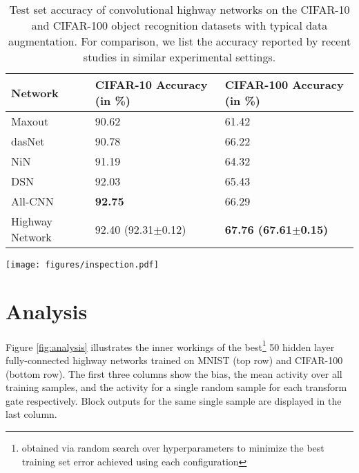 \documentclass{article}
\begin{document}
\begin{table}
\centering
    \begin{tabular}{lll}
       \hline
       \textbf{Network} & \textbf{CIFAR-10 Accuracy (in \%)} & \textbf{CIFAR-100 Accuracy (in \%)} \\ \hline
       Maxout \cite{Goodfellow2013}      & 90.62                 & 61.42\\ 
       dasNet \cite{Stollenga2014}       & 90.78                 & 66.22\\
       NiN \cite{Lin2014}                & 91.19                 & 64.32\\
       DSN \cite{Lee2015}                & 92.03                 & 65.43\\
       All-CNN \cite{Springenberg2014}   & \textbf{92.75}        & 66.29\\
       Highway Network                   & 92.40 (92.31$\pm$0.12) & \textbf{67.76 (67.61$\pm$0.15)}\\
       \hline
    \end{tabular}
    \caption{Test set accuracy of convolutional highway networks on the CIFAR-10 and CIFAR-100 object recognition datasets with typical data augmentation. For comparison, we list the accuracy reported by recent studies in similar experimental settings.}
        \label{tab:sota-cifar}
\end{table}


\begin{figure*}[t]
\texttt{[image: figures/inspection.pdf]}
\caption{Visualization of best 50 hidden-layer highway networks trained on MNIST (top row) and CIFAR-100 (bottom row). 
The first hidden layer is a plain layer which changes the dimensionality of the representation to 50. 
Each of the 49 highway layers (y-axis) consists of 50 blocks (x-axis).
The first column shows the transform gate biases, which were initialized to -2 and -4 respectively. 
In the second column the mean output of the transform gate over all training examples is depicted.
The third and fourth columns show the output of the transform gates and the block outputs (both networks using tanh) for a single random training sample. Best viewed in color.}
\label{fig:analysis}
\end{figure*}

\section{Analysis}
Figure \ref{fig:analysis} illustrates the inner workings of the best\footnote{obtained via random search over hyperparameters to minimize the best training set error achieved using each configuration} 50 hidden layer fully-connected highway networks trained on MNIST (top row) and CIFAR-100 (bottom row). The first three columns show the bias, the mean activity over all training samples, and the activity for a single random sample for each transform gate respectively. Block outputs for the same single sample are displayed in the last column.
\end{document}
